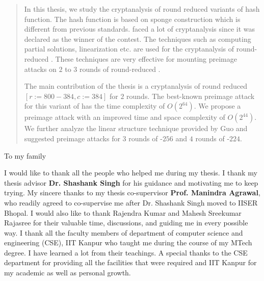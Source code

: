 \begin{abstract}
	
In this thesis, we study the cryptanalysis of round reduced variants of
\KECCAK{} hash function. The \KECCAK{} hash function is based on sponge
construction which is different from previous \SHA{} standards. 
\KECCAK{} faced a lot of cryptanalysis since it was declared as the
winner of the  contest. The techniques such as computing partial
solutions,  linearization etc. are used for the cryptanalysis of
round-reduced \KECCAK{}. These techniques are very effective for
mounting preimage attacks on $2$ to $3$ rounds of round-reduced \KECCAK{}. 

The main contribution of the thesis is a cryptanalysis of round reduced
\KECCAK{}$[r:=800-384, c:=384]$ for $2$ rounds. The best-known preimage
attack for this variant of \KECCAK{} has the time complexity of
 $O(2^{64})$. We propose a preimage attack with an improved time and
space complexity of $O(2^{44})$. We further analyze the linear structure
technique provided by Guo \etal and suggested preimage attacks for $3$ rounds of \KECCAK-$256$ and $4$ rounds of \KECCAK-$224$.
\end{abstract}

\begin{dedication}
To my family
\end{dedication}

\begin{acknowledgments}

I would like to thank all the people who helped me during my thesis. I thank my thesis advisor \textbf{Dr. Shashank Singh} for his guidance and motivating me to keep trying.
My sincere thanks to my thesis co-supervisor \textbf{Prof. Manindra Agrawal}, who readily agreed to co-supervise me after Dr. Shashank Singh moved to IISER Bhopal. 
% 
% 
 I would also like to thank Rajendra Kumar and Mahesh Sreekumar Rajasree
  for their valuable time, discussions, and guiding me in every possible
  way. I thank all the faculty members of department of computer science
  and engineering (CSE), IIT Kanpur who taught me during the course of my
  MTech degree. I have learned a lot from their teachings. A special
  thanks to the CSE department for providing all the facilities that were required and  IIT Kanpur for my academic as well as personal growth.
\end{acknowledgments}

\tableofcontents
\listoftables

\cleardoublepage
{} \label{listoffig}
\listoffigures

\cleardoublepage{} %
